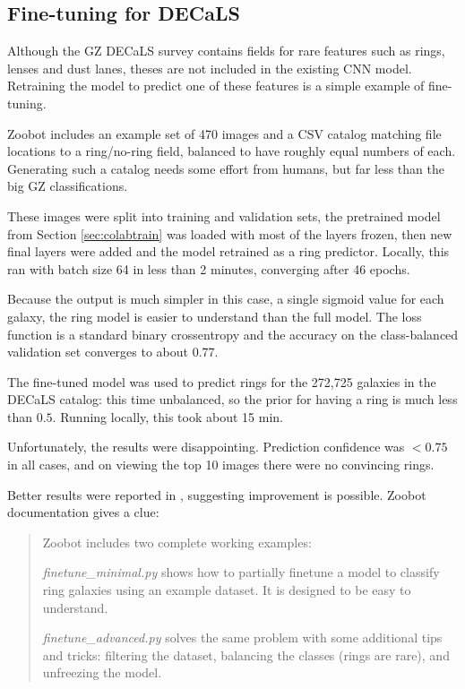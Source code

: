 \documentclass[preprint]{aastex631}
\begin{document}
\subsection{Fine-tuning for DECaLS}

Although the GZ DECaLS survey contains fields for rare features such as rings, lenses and dust lanes, theses are not included in the existing CNN model. Retraining the model to predict one of these features is a simple example of fine-tuning.

Zoobot includes an example set of 470 images and a CSV catalog matching file locations to a ring/no-ring field, balanced to have roughly equal numbers of each. Generating such a catalog needs some effort from humans, but far less than the big GZ classifications. 

These images were split into training and validation sets, the pretrained model from Section \ref{sec:colabtrain} was loaded with most of the layers frozen, then new final layers were added and the model retrained as a ring predictor. Locally, this ran with batch size 64 in less than 2 minutes, converging after 46 epochs.

Because the output is much simpler in this case, a single sigmoid value for each galaxy, the ring model is easier to understand than the full model. The loss function is a standard binary crossentropy and the accuracy on the class-balanced validation set converges to about 0.77.

The fine-tuned model was used to predict rings for the 272,725 galaxies in the DECaLS catalog: this time unbalanced, so the prior for having a ring is much less than $0.5$. Running locally, this took about 15 min.

Unfortunately, the results were disappointing. Prediction confidence was $<0.75$ in all cases, and on viewing the top 10 images there were no convincing rings.

Better results were reported in \citet{walmsley_galaxy_2022}, suggesting improvement is possible. Zoobot documentation gives a clue:

\begin{quote}
	 Zoobot includes two complete working examples:

	\textit{finetune\_minimal.py} shows how to partially finetune a model to classify ring galaxies using an example dataset. It is designed to be easy to understand.
	
	\textit{finetune\_advanced.py} solves the same problem with some additional tips and tricks: filtering the dataset, balancing the classes (rings are rare), and unfreezing the model.
\end{quote}
\end{document}
